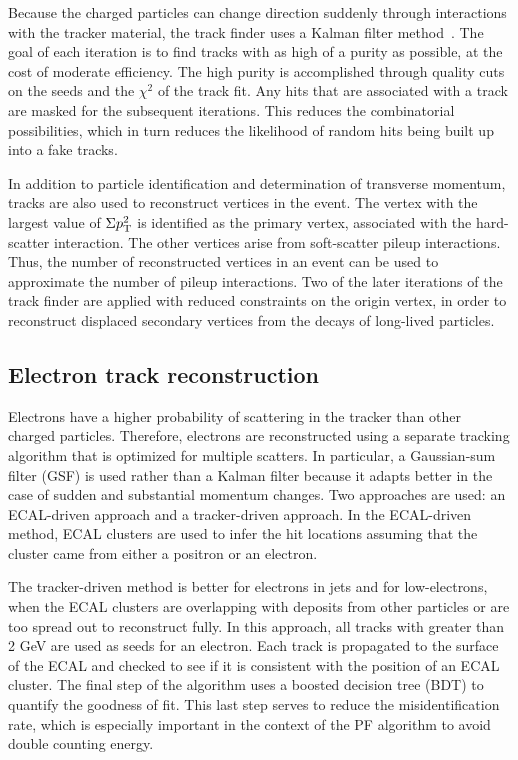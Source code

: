 Because the charged particles can change direction suddenly through interactions with the tracker material, the track finder uses a Kalman filter method~\cite{Kalman}. The goal of each iteration is to find tracks with as high of a purity as possible, at the cost of moderate efficiency. The high purity is accomplished through quality cuts on the seeds and the $\chi^2$ of the track fit. Any hits that are associated with a track are masked for the subsequent iterations. This reduces the combinatorial possibilities, which in turn reduces the likelihood of random hits being built up into a fake tracks. 

In addition to particle identification and determination of transverse momentum, tracks are also used to reconstruct vertices in the event. 
The vertex with the largest value of $\Sigma p_{\mathrm{T}}^2$ is identified as the primary vertex, associated with the hard-scatter interaction. The other vertices arise from soft-scatter pileup interactions. Thus, the number of reconstructed vertices in an event can be used to approximate the number of pileup interactions. Two of the later iterations of the track finder are applied with reduced constraints on the origin vertex, in order to reconstruct displaced secondary vertices from the decays of long-lived particles. 

\subsection{Electron track reconstruction}
\label{sec:eleTrackReco}

Electrons have a higher probability of scattering in the tracker than other charged particles. Therefore, electrons are reconstructed using a separate tracking algorithm that is optimized for multiple scatters. In particular, a Gaussian-sum filter (GSF) is used rather than a Kalman filter because it adapts better in the case of sudden and substantial momentum changes. Two approaches are used: an ECAL-driven approach and a tracker-driven approach. In the ECAL-driven method, ECAL clusters are used to infer the hit locations assuming that the cluster came from either a positron or an electron. 

The tracker-driven method is better for electrons in jets and for low-\pt electrons, when the ECAL clusters are overlapping with deposits from other particles or are too spread out to reconstruct fully. In this approach, all tracks with \pt greater than 2 GeV are used as seeds for an electron. Each track is propagated to the surface of the ECAL and checked to see if it is consistent with the position of an ECAL cluster. The final step of the algorithm uses a boosted decision tree (BDT) to quantify the goodness of fit. This last step serves to reduce the misidentification rate, which is especially important in the context of the PF algorithm to avoid double counting energy.

